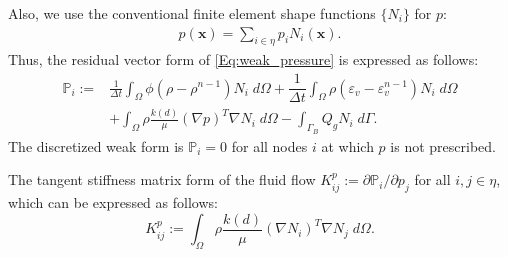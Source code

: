 {Also, we {use} %
the conventional finite element shape functions $\{N_i\}$ for $p$:}
\begin{equation}\label{Eq:p_discretized}
\begin{aligned}
	    p(\bm{x})=\sum_{i\in\eta} p_i N_i(\bm{x}).
\end{aligned}
\end{equation}
{Thus, the residual vector form of \ref{Eq:weak_pressure} is expressed as follows:}
\begin{equation}\label{Eq:flow_weak}
\begin{aligned}
      \mathbb{P}_i := &  \frac{1}{\Delta t} \int_{\Omega} {\phi}(\rho-\rho^{n-1}) {N_i} \; d\Omega + \dfrac{1}{{\Delta t}}\int_{\Omega} \rho(\varepsilon_v-\varepsilon_v^{n-1}) {N_i} \; d\Omega \\& +  \int_{\Omega} \rho \frac{k(d)}{\mu} (\nabla p)^T \nabla {N_i} \; d\Omega   
                        -\int_{\Gamma_B} Q_g {N_i} \;d\Gamma.
\end{aligned}
\end{equation}
{The discretized weak form is $\mathbb{P}_i=0$ for all nodes $i$ at which $p$ is not prescribed.}

{The tangent stiffness matrix form of the fluid flow $K_{ij}^p:=\partial\mathbb{P}_i/\partial{p}_j$ %
for all $i,j\in\eta$, which can be expressed as follows:}
\begin{equation}\label{Eq:flow_stiff}
      K_{ij}^p :=    \int_{\Omega} \rho \frac{k(d)}{\mu} (\nabla N_i)^T  \nabla {N_j} \; d\Omega.
\end{equation}
